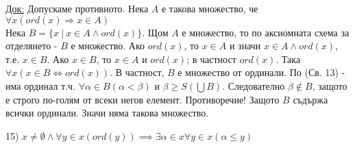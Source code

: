 \documentclass[fleqn, titlepage, 12pt]{report}
\begin{document}
\underline{Док:} Допускаме противното. Нека $ A $ е такова множество, че $ \forall{x}(ord(x) \Rightarrow x \in A) $\\
Нека $ B = \{x\ |\ x \in A \land ord(x)\} $. Щом $ A $ е множество, то по аксиомната схема за отделянето -
$ B $ е множество. Ако $ ord(x) $, то $ x \in A $ и значи $ x \in A \land ord(x) $, т.е. $ x \in B $.
Ако $ x \in B $, то $ x \in A $ и $ ord(x) $; в частност $ ord(x) $. Така $ \forall{x}(x \in B \Leftrightarrow ord(x)) $.
В частност, $ B $ е множество от ординали. По (Св. 13) - има ординал т.ч. $ \forall{ \alpha \in B} ( \alpha < \beta) $
и $ \beta \geq S(\bigcup B) $. Следователно $ \beta \notin B $, защото е строго по-голям от всеки негов елемент.
Противоречие! Защото $ B $ съдържа всички ординали. Значи няма такова множество.
\bigbreak

15) $ x \neq \emptyset \land \forall{y \in x}(ord(y)) \implies \exists{ \alpha \in x}\forall{y \in x}( \alpha \leq y)$
\end{document}
